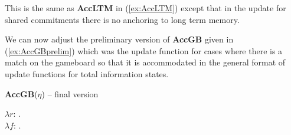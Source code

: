 This is the same as \textbf{AccLTM} in (\ref{ex:AccLTM}) except that
in the update for shared commitments 
there is no anchoring to long term memory.

We can now adjust the preliminary version of \textbf{AccGB} given in
(\ref{ex:AccGBprelim}) which was the update function for cases where there is a
match on the gameboard so that it is accommodated in the general format of update functions for
total information states.  %

\scalebox{.9}
{\begin{ex} 
\textbf{AccGB}($\eta$) -- final version


\hspace*{-3em}$\lambda r$: . \\
\hspace*{-2em} $\lambda
f$:
              . \\
\hspace*{-1em} 
 
\end{ex}  
}
